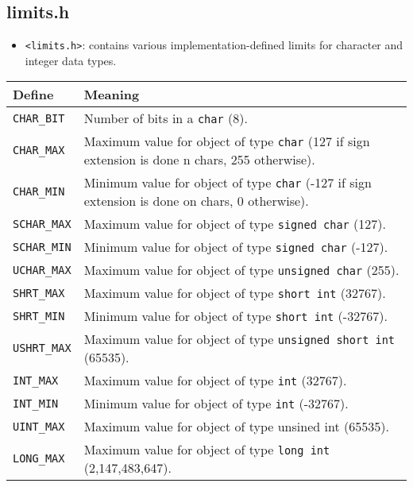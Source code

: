 \subsection{limits.h}
\begin{itemize}
    \item \verb|<limits.h>|: contains various implementation-defined limits for character and integer data types.
\end{itemize}
\begin{center}
    \begin{tabular}{ |p{6cm}|p{10cm}| }
        \hline
            Define & Meaning \\
        \hline
            \texttt{CHAR_BIT} & Number of bits in a \texttt{char} (8). \\ 
            \texttt{CHAR_MAX} & Maximum value for object of type \texttt{char} (127 if sign extension is done n chars, 255 otherwise). \\ 
            \texttt{CHAR_MIN} & Minimum value for object of type \texttt{char} (-127 if sign extension is done on chars, 0 otherwise). \\ 
            \texttt{SCHAR_MAX} & Maximum value for object of type \texttt{signed char} (127). \\ 
            \texttt{SCHAR_MIN} & Minimum value for object of type \texttt{signed char} (-127). \\ 
            \texttt{UCHAR_MAX} & Maximum value for object of type \texttt{unsigned char} (255). \\ 
            \texttt{SHRT_MAX} & Maximum value for object of type \texttt{short int} (32767). \\ 
            \texttt{SHRT_MIN} & Minimum value for object of type \texttt{short int} (-32767). \\ 
            \texttt{USHRT_MAX} & Maximum value for object of type \texttt{unsigned short int} (65535). \\ 
            \texttt{INT_MAX} & Maximum value for object of type \texttt{int} (32767). \\ 
            \texttt{INT_MIN} & Minimum value for object of type \texttt{int} (-32767). \\ 
            \texttt{UINT_MAX} & Maximum value for object of type unsined int (65535). \\ 
            \texttt{LONG_MAX} & Maximum value for object of type \texttt{long int} (2,147,483,647). \\ 

\end{tabular}
\end{center}
